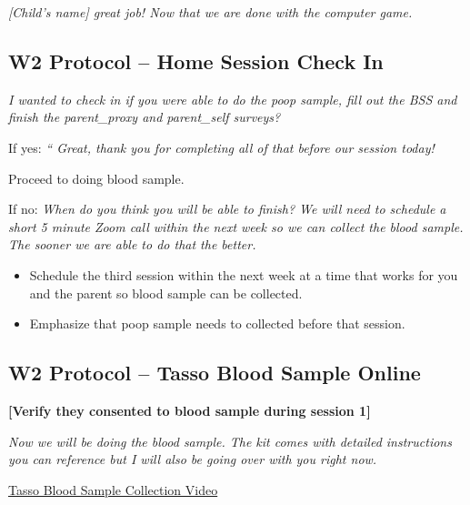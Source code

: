 \documentclass[
]{book}
\begin{document}
\emph{{[}Child's name{]} great job! Now that we are done with the computer game.}

\hypertarget{w2-protocol-home-session-check-in}{%
\subsection{W2 Protocol -- Home Session Check In}\label{w2-protocol-home-session-check-in}}

\emph{I wanted to check in if you were able to do the poop sample, fill out the BSS and finish the parent\_proxy and parent\_self surveys?}

If yes: \emph{`` Great, thank you for completing all of that before our session today!}

Proceed to doing blood sample.

If no: \emph{When do you think you will be able to finish? We will need to schedule a short 5 minute Zoom call within the next week so we can collect the blood sample. The sooner we are able to do that the better.}

\begin{itemize}
\item
  Schedule the third session within the next week at a time that works for you and the parent so blood sample can be collected.
\item
  Emphasize that poop sample needs to collected before that session.
\end{itemize}

\hypertarget{w2-protocol-tasso-blood-sample-online}{%
\subsection{W2 Protocol -- Tasso Blood Sample Online}\label{w2-protocol-tasso-blood-sample-online}}

\textbf{{[}Verify they consented to blood sample during session 1{]}}

\emph{Now we will be doing the blood sample. The kit comes with detailed instructions you can reference but I will also be going over with you right now. }

\href{https://vimeo.com/409226805}{Tasso Blood Sample Collection Video}
\end{document}
